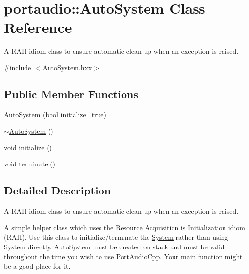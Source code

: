 \hypertarget{classportaudio_1_1_auto_system}{}\section{portaudio\+:\+:Auto\+System Class Reference}
\label{classportaudio_1_1_auto_system}


A R\+A\+II idiom class to ensure automatic clean-\/up when an exception is raised.  




{\ttfamily \#include $<$Auto\+System.\+hxx$>$}

\subsection*{Public Member Functions}
\begin{DoxyCompactItemize}
\item 
\hyperlink{classportaudio_1_1_auto_system_ae516b8cd738cb76ecd82e423ae670f58}{Auto\+System} (\hyperlink{mac_2config_2i386_2lib-src_2libsoxr_2soxr-config_8h_abb452686968e48b67397da5f97445f5b}{bool} \hyperlink{classportaudio_1_1_auto_system_a6acb42f8ad73c7ea22512f12181aa26c}{initialize}=\hyperlink{mac_2config_2i386_2lib-src_2libsoxr_2soxr-config_8h_a41f9c5fb8b08eb5dc3edce4dcb37fee7}{true})
\item 
\hyperlink{classportaudio_1_1_auto_system_aea5bad4f2025d9cacc793a0e287cedb4}{$\sim$\+Auto\+System} ()
\item 
\hyperlink{sound_8c_ae35f5844602719cf66324f4de2a658b3}{void} \hyperlink{classportaudio_1_1_auto_system_a6acb42f8ad73c7ea22512f12181aa26c}{initialize} ()
\item 
\hyperlink{sound_8c_ae35f5844602719cf66324f4de2a658b3}{void} \hyperlink{classportaudio_1_1_auto_system_a8a2c15af84ef28b5e254a8f589023875}{terminate} ()
\end{DoxyCompactItemize}


\subsection{Detailed Description}
A R\+A\+II idiom class to ensure automatic clean-\/up when an exception is raised. 

A simple helper class which uses the \textquotesingle{}Resource Acquisition is Initialization\textquotesingle{} idiom (R\+A\+II). Use this class to initialize/terminate the \hyperlink{classportaudio_1_1_system}{System} rather than using \hyperlink{classportaudio_1_1_system}{System} directly. \hyperlink{classportaudio_1_1_auto_system}{Auto\+System} must be created on stack and must be valid throughout the time you wish to use Port\+Audio\+Cpp. Your \textquotesingle{}main\textquotesingle{} function might be a good place for it.


